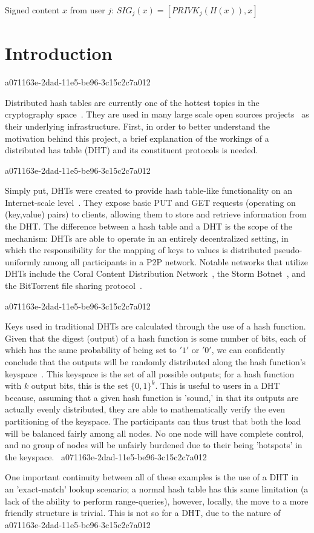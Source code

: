 \documentclass[12pt]{article}
\begin{document}
Signed content $x$ from user $j$: $SIG_j(x) = \left[ PRIVK_j( H(x) ), x \right]$

\section{Introduction}
a071163e-2dad-11e5-be96-3c15c2c7a012\par Distributed hash tables are currently one of the hottest topics in the cryptography space~\cite{Stoica:2001dj,Rowstron:2001ea,Ratnasamy:2001wn}. They are used in many large scale open sources projects~\cite{Freitas:2013tb,Xu:2010vs,Perfitt:2010fh} as their underlying infrastructure. First, in order to better understand the motivation behind this project, a brief explanation of the workings of a distributed has table (DHT) and its constituent protocols is needed.

a071163e-2dad-11e5-be96-3c15c2c7a012\par Simply put, DHTs were created to provide hash table-like functionality on an Internet-scale level~\cite{Ratnasamy:2001wn}. They expose basic PUT and GET requests (operating on (key,value) pairs) to clients, allowing them to store and retrieve information from the DHT. The difference between a hash table and a DHT is the scope of the mechanism: DHTs are able to operate in an entirely decentralized setting, in which the responsibility for the mapping of keys to values is distributed pseudo-uniformly among all participants in a P2P network. Notable networks that utilize DHTs include the Coral Content Distribution Network~\cite{Freedman:2004vb}, the Storm Botnet~\cite{Holz:2008uk}, and the BitTorrent file sharing protocol~\cite{Cohen:y1_8mBnw}.

a071163e-2dad-11e5-be96-3c15c2c7a012\par Keys used in traditional DHTs are calculated through the use of a hash function. Given that the digest (output) of a hash function is some number of bits, each of which has the same probability of being set to $'1'$ or $'0'$, we can confidently conclude that the outputs will be randomly distributed along the hash function's keyspace~. This keyspace is the set of all possible outputs; for a hash function with $k$ output bits, this is the set $\{0,1\}^k$. This is useful to users in a DHT because, assuming that a given hash function is 'sound,' in that its outputs are actually evenly distributed, they are able to mathematically verify the even partitioning of the keyspace. The participants can thus trust that both the load will be balanced fairly among all nodes. No one node will have complete control, and no group of nodes will be unfairly burdened due to their being 'hotspots' in the keyspace.~
a071163e-2dad-11e5-be96-3c15c2c7a012
\par One important continuity between all of these examples is the use of a DHT in an 'exact-match' lookup scenario; a normal hash table has this same limitation (a lack of the ability to perform range-queries), however, locally, the move to a more friendly structure is trivial. This is not so for a DHT, due to the nature of
a071163e-2dad-11e5-be96-3c15c2c7a012\printbibliography
\end{document}

